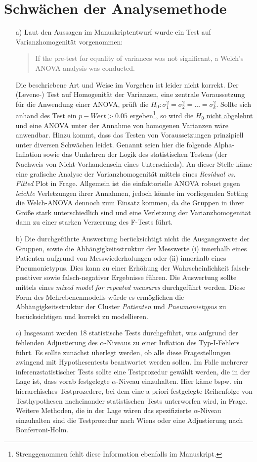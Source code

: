 \documentclass[toc=sectionentrywithdots]{scrartcl}
\theoremstyle{definition}
\theoremstyle{remark}
\begin{document}
\section{Schwächen der Analysemethode}
\begin{enumerate}
	\item[a) ]Laut den Aussagen im Manuskriptentwurf wurde ein Test auf Varianzhomogenität vorgenommen: 
	\begin{quotation}
		If the pre-test for equality of variances was not significant, a Welch's ANOVA analysis was conducted.
	\end{quotation}
	Die beschriebene Art und Weise im Vorgehen ist leider nicht korrekt. Der (Levene-) Test auf Homogenität der Varianzen, eine zentrale Voraussetzung für die Anwendung einer ANOVA, prüft die $H_0: \sigma^{2}_{1} = \sigma^{2}_{2} = \dots = \sigma^{2}_k$. Sollte sich anhand des Test ein $p-Wert>0.05$ ergeben\footnote{Strenggenommen fehlt diese Information ebenfalls im Manuskript.}, so wird die \underline{$H_0$ nicht abgelehnt} und eine ANOVA unter der Annahme von homogenen Varianzen wäre anwendbar. Hinzu kommt, dass das Testen von Voraussetzungen prinzipiell unter diversen Schwächen leidet. Genannt seien hier die folgende Alpha-Inflation sowie das Umkehren der Logik des statistischen Testens (der Nachweis von Nicht-Vorhandensein eines Unterschieds). An dieser Stelle käme eine grafische Analyse der Varianzhomogenität mittels eines \textit{Residual vs. Fitted} Plot in Frage. Allgemein ist die einfaktorielle ANOVA  robust gegen \textit{leichte} Verletzungen ihrer Annahmen, jedoch könnte im vorliegenden Setting die Welch-ANOVA  dennoch zum Einsatz kommen, da die Gruppen in ihrer Größe stark unterschiedlich sind und eine Verletzung der Varianzhomogenität dann zu einer starken Verzerrung des F-Tests führt.
	\item[b) ] Die durchgeführte Auswertung berücksichtigt nicht die Ausgangswerte der Gruppen, sowie die Abhängigkeitsstruktur der Messwerte (i) innerhalb eines Patienten aufgrund von Messwiederholungen oder (ii) innerhalb eines Pneumonietypus. Dies kann zu einer Erhöhung der Wahrscheinlichkeit falsch-positiver sowie falsch-negativer Ergebnisse führen. Die Auswertung sollte mittels eines  \textit{mixed model for repeated measures} durchgeführt werden. Diese Form des Mehrebenenmodells würde es ermöglichen die Abhängigkeitsstruktur der Cluster \textit{Patienten} und \textit{Pneumonietypus} zu berücksichtigen und korrekt zu modellieren.
	\item[c) ]Insgesamt werden 18 statistische Tests durchgeführt, was aufgrund der fehlenden Adjustierung des $\alpha$-Niveaus zu einer Inflation des Typ-I-Fehlers führt. Es sollte zunächst überlegt werden, ob alle diese Fragestellungen zwingend mit Hypothesentests beantwortet werden sollen. Im Falle mehrerer inferenzstatistischer Tests sollte eine Testprozedur gewählt werden, die in der Lage ist, dass vorab festgelegte $\alpha$-Niveau einzuhalten. Hier käme bspw. ein hierarchisches Testprozedere, bei dem eine a priori festgelegte Reihenfolge von Testhypothesen nacheinander statistischen Tests unterworfen wird, in Frage. Weitere Methoden, die in der Lage wären das spezifizierte $\alpha$-Niveau einzuhalten sind die Testprozedur nach Wiens oder eine Adjustierung nach Bonferroni-Holm.

\end{enumerate}
\end{document}
